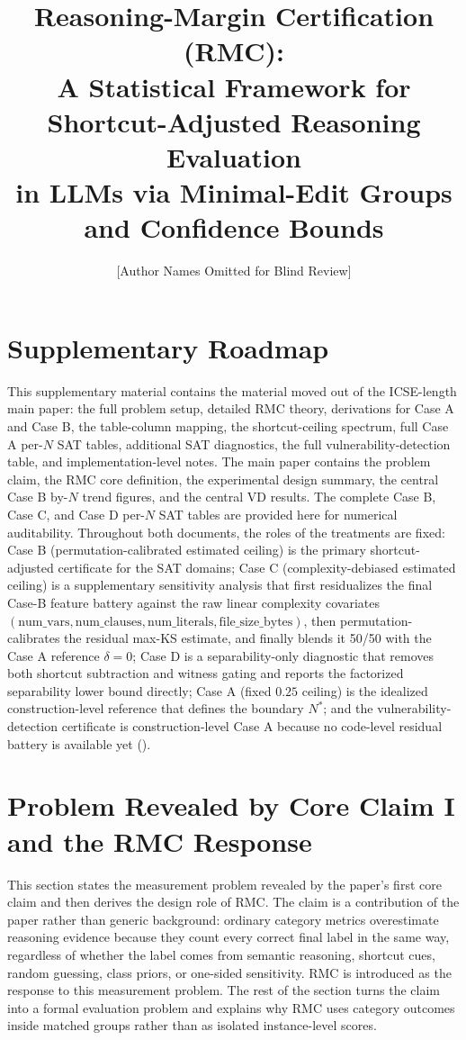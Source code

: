 \documentclass[conference]{IEEEtran}
\title{%
  \textbf{Reasoning-Margin Certification (RMC):}\\
  A Statistical Framework for Shortcut-Adjusted Reasoning Evaluation\\
  in LLMs via Minimal-Edit Groups and Confidence Bounds
}
\author{
  [Author Names Omitted for Blind Review]
}
\date{}
\theoremstyle{remark}
\begin{document}
\maketitle

\section{Supplementary Roadmap}
This supplementary material contains the material moved out of the ICSE-length main paper: the full problem setup, detailed RMC theory, derivations for Case A and Case B, the table-column mapping, the shortcut-ceiling spectrum, full Case A per-$N$ SAT tables, additional SAT diagnostics, the full vulnerability-detection table, and implementation-level notes.  The main paper contains the problem claim, the RMC core definition, the experimental design summary, the central Case B by-$N$ trend figures, and the central VD results.  The complete Case B, Case C, and Case D per-$N$ SAT tables are provided here for numerical auditability.  Throughout both documents, the roles of the treatments are fixed: Case B (permutation-calibrated estimated ceiling) is the primary shortcut-adjusted certificate for the SAT domains; Case C (complexity-debiased estimated ceiling) is a supplementary sensitivity analysis that first residualizes the final Case-B feature battery against the raw linear complexity covariates $(\text{num\_vars}, \text{num\_clauses}, \text{num\_literals}, \text{file\_size\_bytes})$, then permutation-calibrates the residual max-KS estimate, and finally blends it 50/50 with the Case A reference $\delta=0$; Case D is a separability-only diagnostic that removes both shortcut subtraction and witness gating and reports the factorized separability lower bound directly; Case A (fixed $0.25$ ceiling) is the idealized construction-level reference that defines the boundary $N^*$; and the vulnerability-detection certificate is construction-level Case A because no code-level residual battery is available yet ().

\section{Problem Revealed by Core Claim I and the RMC Response}
\label{sec:setup}

This section states the measurement problem revealed by the paper's first core claim and then derives the design role of RMC.  The claim is a contribution of the paper rather than generic background: ordinary category metrics overestimate reasoning evidence because they count every correct final label in the same way, regardless of whether the label comes from semantic reasoning, shortcut cues, random guessing, class priors, or one-sided sensitivity.  RMC is introduced as the response to this measurement problem.  The rest of the section turns the claim into a formal evaluation problem and explains why RMC uses category outcomes inside matched groups rather than as isolated instance-level scores.
\end{document}

